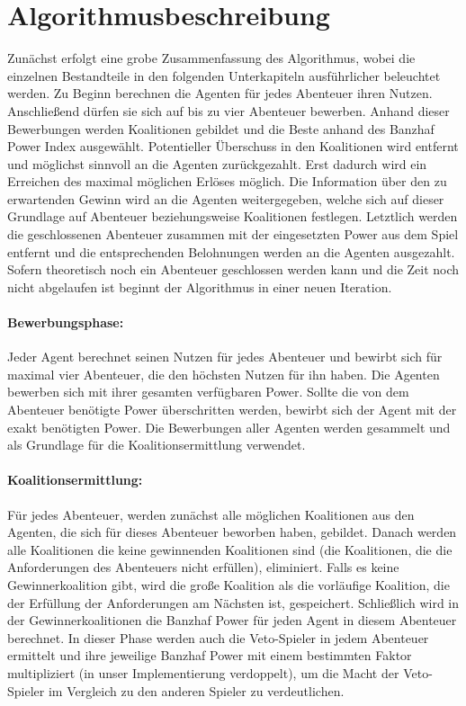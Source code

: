 \documentclass[fleqn,10pt]{SelfArx} %
\begin{document}

\section{Algorithmusbeschreibung}
\label{sec:Algorithmus}
Zunächst erfolgt eine grobe Zusammenfassung des Algorithmus, wobei die einzelnen Bestandteile in den folgenden Unterkapiteln ausführlicher beleuchtet werden. Zu Beginn berechnen die Agenten für jedes Abenteuer ihren Nutzen. Anschließend dürfen sie sich auf bis zu vier Abenteuer bewerben. Anhand dieser Bewerbungen werden Koalitionen gebildet und die Beste anhand des Banzhaf Power Index ausgewählt. Potentieller Überschuss in den Koalitionen wird entfernt und möglichst sinnvoll an die Agenten zurückgezahlt. Erst dadurch wird ein Erreichen des maximal möglichen Erlöses möglich. Die Information über den zu erwartenden Gewinn wird an die Agenten weitergegeben, welche sich auf dieser Grundlage auf Abenteuer beziehungsweise Koalitionen festlegen. Letztlich werden die geschlossenen Abenteuer zusammen mit der eingesetzten Power aus dem Spiel entfernt und die entsprechenden Belohnungen werden an die Agenten ausgezahlt. Sofern theoretisch noch ein Abenteuer geschlossen werden kann und die Zeit noch nicht abgelaufen ist beginnt der Algorithmus in einer neuen Iteration.

\paragraph{Bewerbungsphase:}
Jeder Agent berechnet seinen Nutzen für jedes Abenteuer und bewirbt sich für maximal vier Abenteuer, die den höchsten Nutzen für ihn haben. Die Agenten bewerben sich mit ihrer gesamten verfügbaren Power. Sollte die von dem Abenteuer benötigte Power überschritten werden, bewirbt sich der Agent mit der exakt benötigten Power. Die Bewerbungen aller Agenten werden gesammelt und als Grundlage für die Koalitionsermittlung verwendet. 

\paragraph{Koalitionsermittlung:}
Für jedes Abenteuer, werden zunächst alle möglichen Koalitionen aus den Agenten, die sich für dieses Abenteuer beworben haben, gebildet. Danach werden alle Koalitionen die keine gewinnenden Koalitionen sind (die Koalitionen, die die Anforderungen des Abenteuers nicht erfüllen), eliminiert. Falls es keine Gewinnerkoalition gibt, wird die große Koalition als die vorläufige Koalition, die der Erfüllung der Anforderungen am Nächsten ist, gespeichert. Schließlich wird in der Gewinnerkoalitionen die Banzhaf Power für jeden Agent in diesem Abenteuer berechnet. In dieser Phase werden auch die Veto-Spieler in jedem Abenteuer ermittelt und ihre jeweilige Banzhaf Power mit einem bestimmten Faktor multipliziert (in unser Implementierung verdoppelt), um die Macht der Veto-Spieler im Vergleich zu den anderen Spieler zu verdeutlichen. 
\end{document}
